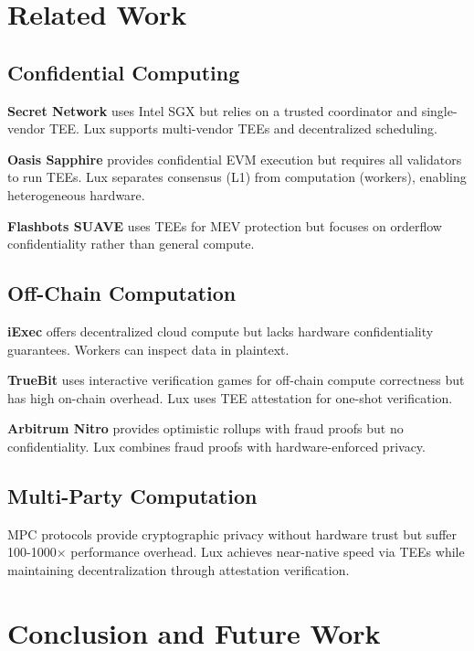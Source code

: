 \documentclass[11pt,letterpaper]{article}
\begin{document}
\section{Related Work}

\subsection{Confidential Computing}

\textbf{Secret Network} \cite{secret-network} uses Intel SGX but relies on a trusted coordinator and single-vendor TEE. Lux supports multi-vendor TEEs and decentralized scheduling.

\textbf{Oasis Sapphire} \cite{oasis-sapphire} provides confidential EVM execution but requires all validators to run TEEs. Lux separates consensus (L1) from computation (workers), enabling heterogeneous hardware.

\textbf{Flashbots SUAVE} \cite{flashbots-suave} uses TEEs for MEV protection but focuses on orderflow confidentiality rather than general compute.

\subsection{Off-Chain Computation}

\textbf{iExec} \cite{iexec} offers decentralized cloud compute but lacks hardware confidentiality guarantees. Workers can inspect data in plaintext.

\textbf{TrueBit} \cite{truebit} uses interactive verification games for off-chain compute correctness but has high on-chain overhead. Lux uses TEE attestation for one-shot verification.

\textbf{Arbitrum Nitro} \cite{arbitrum} provides optimistic rollups with fraud proofs but no confidentiality. Lux combines fraud proofs with hardware-enforced privacy.

\subsection{Multi-Party Computation}

MPC protocols \cite{mpc-overview} provide cryptographic privacy without hardware trust but suffer 100-1000$\times$ performance overhead. Lux achieves near-native speed via TEEs while maintaining decentralization through attestation verification.

\section{Conclusion and Future Work}
\end{document}
